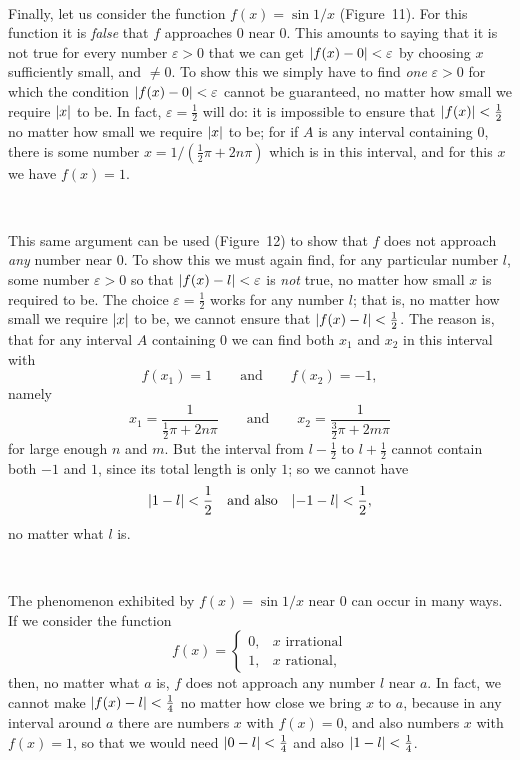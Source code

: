 \begin{center}
\\[0.6em]
\end{center}
Finally, let us consider the function $f(x)=\sin 1/x$ (Figure~11). For this
function it is \emph{false} that $f$ approaches $0$ near $0$. This amounts to
saying that it is not true for every number $\varepsilon>0$ that we can get
$\lvert f(x)-0\rvert<\varepsilon$ by choosing $x$ sufficiently small, and $\neq 0$.
To show this we simply have to find \emph{one} $\varepsilon>0$ for which the
condition $\lvert f(x)-0\rvert<\varepsilon$ cannot be guaranteed, no matter how small
we require $\lvert x\rvert$ to be. In fact, $\varepsilon=\frac{1}{2}$ will do: it is
impossible to ensure that $\lvert f(x)\rvert<\frac{1}{2}$ no matter how small we
require $\lvert x\rvert$ to be; for if $A$ is any interval containing $0$, there is
some number $x=1/(\frac{1}{2}\pi+2n\pi)$ which is in this interval, and for
this $x$ we have $f(x)=1$.

\begin{center}
\\[0.6em]
\end{center}
This same argument can be used (Figure~12) to show that $f$ does not approach
\emph{any} number near $0$. To show this we must again find, for any
particular number $l$, some number $\varepsilon>0$ so that
$\lvert f(x)-l\rvert<\varepsilon$ is \emph{not} true, no matter how small $x$ is
required to be. The choice $\varepsilon=\frac{1}{2}$ works for any number $l$;
that is, no matter how small we require $\lvert x\rvert$ to be, we cannot ensure that
$\lvert f(x)-l\rvert<\frac{1}{2}$. The reason is, that for any interval $A$
containing $0$ we can find both $x_1$ and $x_2$ in this interval with
\[
f(x_1)=1 \qquad\text{and}\qquad f(x_2)=-1,
\]
namely
\[
x_1=\frac{1}{\frac{1}{2}\pi+2n\pi} \qquad\text{and}\qquad
x_2=\frac{1}{\frac{3}{2}\pi+2m\pi}
\]
for large enough $n$ and $m$. But the interval from $l-\frac{1}{2}$ to
$l+\frac{1}{2}$ cannot contain both $-1$ and $1$, since its total length is
only $1$; so we cannot have
\[
\lvert1-l\rvert<\frac{1}{2} \quad\text{and also}\quad \lvert-1-l\rvert<\frac{1}{2},
\]
no matter what $l$ is.

\begin{center}
\\[0.6em]
\end{center}
The phenomenon exhibited by $f(x)=\sin 1/x$ near $0$ can occur in many ways.
If we consider the function
\[
f(x)=\begin{cases}
0, & x\text{ irrational}\\
1, & x\text{ rational},
\end{cases}
\]
then, no matter what $a$ is, $f$ does not approach any number $l$ near $a$.
In fact, we cannot make $\lvert f(x)-l\rvert<\frac{1}{4}$ no matter how close we
bring $x$ to $a$, because in any interval around $a$ there are numbers $x$
with $f(x)=0$, and also numbers $x$ with $f(x)=1$, so that we would need
$\lvert0-l\rvert<\frac{1}{4}$ and also $\lvert1-l\rvert<\frac{1}{4}$.

